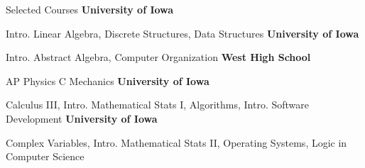 \begin{rubric}{Selected Courses}
\entry*[Fall 2022]%
	\textbf{University of Iowa} \par Intro. Linear Algebra, Discrete Structures, Data Structures
%
\entry*[Spring 2023]%
	\textbf{University of Iowa} \par Intro. Abstract Algebra, Computer Organization
% 
\entry*[2022-2023]
    \textbf{West High School} \par AP Physics C Mechanics
%
\entry*[Fall 2023]%
	\textbf{University of Iowa} \par Calculus III, Intro. Mathematical Stats I, Algorithms, Intro. Software Development
\entry*[Spring 2024]%
	\textbf{University of Iowa} \par Complex Variables, Intro. Mathematical Stats II, Operating Systems, Logic in Computer Science
\end{rubric}